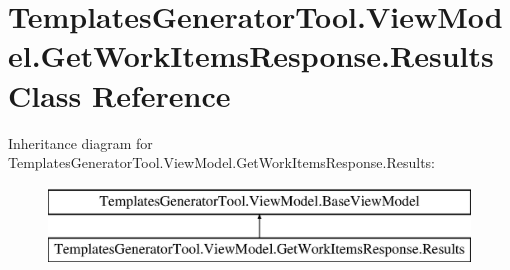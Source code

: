 \hypertarget{class_templates_generator_tool_1_1_view_model_1_1_get_work_items_response_1_1_results}{}\section{Templates\+Generator\+Tool.\+View\+Model.\+Get\+Work\+Items\+Response.\+Results Class Reference}
\label{class_templates_generator_tool_1_1_view_model_1_1_get_work_items_response_1_1_results}
Inheritance diagram for Templates\+Generator\+Tool.\+View\+Model.\+Get\+Work\+Items\+Response.\+Results\+:\begin{figure}[H]
\begin{center}
\leavevmode
\includegraphics[height=2.000000cm]{class_templates_generator_tool_1_1_view_model_1_1_get_work_items_response_1_1_results}
\end{center}
\end{figure}
